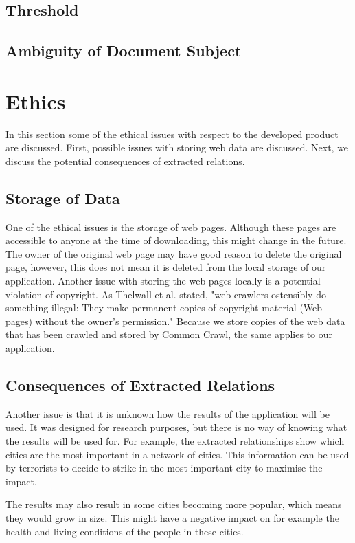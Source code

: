\subsection{Threshold}
\subsection{Ambiguity of Document Subject}


\section{Ethics}
In this section some of the ethical issues with respect to the developed product are discussed. First, possible issues with storing web data are discussed. Next, we discuss the potential consequences of extracted relations.

\subsection{Storage of Data}
One of the ethical issues is the storage of web pages. Although these pages are accessible to anyone at the time of downloading, this might change in the future. The owner of the original web page may have good reason to delete the original page, however, this does not mean it is deleted from the local storage of our application. Another issue with storing the web pages locally is a potential violation of copyright. As Thelwall et al. stated, "web crawlers ostensibly do something illegal: They make permanent copies of copyright material (Web pages) without the owner’s permission."\cite{thelwall2006web} Because we store copies of the web data that has been crawled and stored by Common Crawl, the same applies to our application.

\subsection{Consequences of Extracted Relations}
Another issue is that it is unknown how the results of the application will be used. It was designed for research purposes, but there is no way of knowing what the results will be used for. For example, the extracted relationships show which cities are the most important in a network of cities. This information can be used by terrorists to decide to strike in the most important city to maximise the impact. 

The results may also result in some cities becoming more popular, which means they would grow in size. This might have a negative impact on for example the health and living conditions of the people in these cities.

